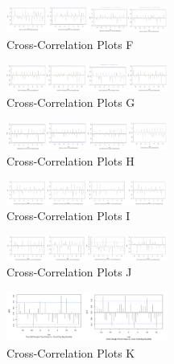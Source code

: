 \documentclass[12pt,oneside]{chicagocapstone}
\begin{document}
\begin{figure}

{\centering \includegraphics[width=200px,angle = 0, scale=2.5]{figure/ccf6} 

}

\caption{Cross-Correlation Plots F}\label{fig:ccf6}
\end{figure}
\begin{figure}

{\centering \includegraphics[width=200px,angle = 0, scale=2.5]{figure/ccf7} 

}

\caption{Cross-Correlation Plots G}\label{fig:ccf7}
\end{figure}
\begin{figure}

{\centering \includegraphics[width=200px,angle = 0, scale=2.5]{figure/ccf8} 

}

\caption{Cross-Correlation Plots H}\label{fig:ccf8}
\end{figure}
\begin{figure}

{\centering \includegraphics[width=200px,angle = 0, scale=2.5]{figure/ccf9} 

}

\caption{Cross-Correlation Plots I}\label{fig:ccf9}
\end{figure}
\begin{figure}

{\centering \includegraphics[width=200px,angle = 0, scale=2.5]{figure/ccf10} 

}

\caption{Cross-Correlation Plots J}\label{fig:ccf10}
\end{figure}
\begin{figure}

{\centering \includegraphics[width=200px,angle = 0, scale=2.5]{figure/ccf11} 

}

\caption{Cross-Correlation Plots K}\label{fig:ccf11}
\end{figure}
\end{document}
